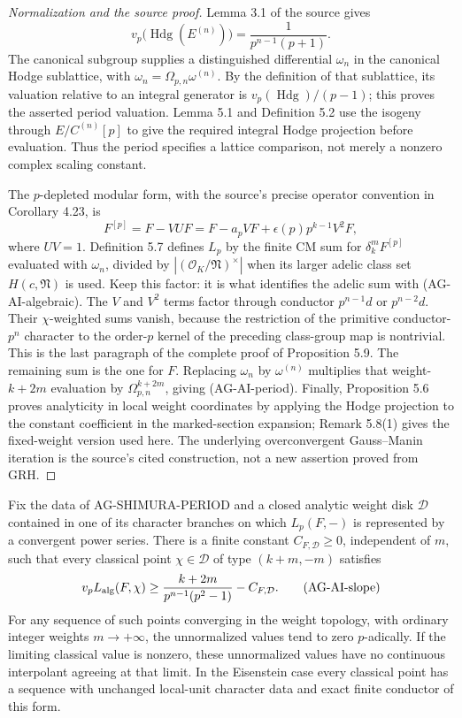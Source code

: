 \begin{proof}[Normalization and the source proof]
Lemma 3.1 of the source gives
\[
 v_p\bigl(\operatorname{Hdg}(E^{(n)})\bigr)
       =\frac1{p^{n-1}(p+1)}.
\]
The canonical subgroup supplies a distinguished differential
$\omega_n$ in the canonical Hodge sublattice, with
$\omega_n=\Omega_{p,n}\omega^{(n)}$.  By the definition of that
sublattice, its valuation relative to an integral generator is
$v_p(\operatorname{Hdg})/(p-1)$; this proves the asserted period
valuation.  Lemma 5.1 and Definition 5.2 use the isogeny through
$E/C^{(n)}[p]$ to give the required integral Hodge projection before
evaluation.  Thus the period specifies a lattice comparison, not
merely a nonzero complex scaling constant.

The $p$-depleted modular form, with the source's precise operator
convention in Corollary 4.23, is
\[
 F^{[p]}=F-VUF
       =F-a_pVF+\epsilon(p)p^{k-1}V^2F,
\]
where $UV=1$.  Definition 5.7 defines $L_p$ by the finite CM sum
for $\delta_k^mF^{[p]}$ evaluated with $\omega_n$, divided by
$| (\mathcal O_K/\mathfrak N)^\times |$ when its larger adelic
class set $H(c,\mathfrak N)$ is used.  Keep this factor: it is what
identifies the adelic sum with (AG-AI-algebraic).
The $V$ and $V^2$ terms factor through conductor $p^{n-1}d$ or
$p^{n-2}d$.  Their $\chi$-weighted sums vanish, because the restriction
of the primitive conductor-$p^n$ character to the order-$p$ kernel
of the preceding class-group map is nontrivial.  This is the last
paragraph of the complete proof of Proposition 5.9.  The remaining
sum is the one for $F$.  Replacing $\omega_n$ by
$\omega^{(n)}$ multiplies that weight-$k+2m$ evaluation by
$\Omega_{p,n}^{k+2m}$, giving (AG-AI-period).
Finally, Proposition 5.6 proves analyticity in local weight
coordinates by applying the Hodge projection to the constant
coefficient in the marked-section expansion; Remark 5.8(1) gives
the fixed-weight version used here.  The underlying overconvergent
Gauss--Manin iteration is the source's cited construction, not a
new assertion proved from GRH.
\end{proof}

\begin{proposition}
Fix the data of AG-SHIMURA-PERIOD and a closed analytic weight disk
$\mathcal D$ contained in one of its character branches on which
$L_p(F,-)$ is represented by a convergent power series.  There is a
finite constant $C_{F,\mathcal D}\geq0$, independent of $m$, such
that every classical point $\chi\in\mathcal D$ of type $(k+m,-m)$
satisfies
\[
 v_p L_{\rm alg}(F,\chi)
       \geq\frac{k+2m}{p^{n-1}(p^2-1)}-C_{F,\mathcal D}.  \tag{AG-AI-slope}
\]
For any sequence of such points converging in the weight topology,
with ordinary integer weights $m\longrightarrow+\infty$, the
unnormalized values tend to zero $p$-adically.  If the limiting
classical value is nonzero, these unnormalized values have no
continuous interpolant agreeing at that limit.  In the Eisenstein
case every classical point has a sequence with unchanged local-unit character data
and exact finite conductor of this form.
\end{proposition}

